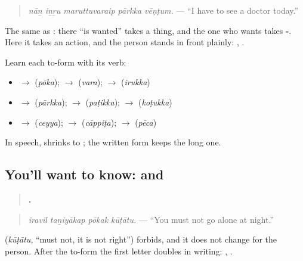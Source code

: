 \begin{quote}
\emph{nāṉ iṉṟu maruttuvaraip pārkka vēṇṭum.} — \textquotedblleft{}I have to see a doctor today.\textquotedblright{}
\end{quote}

The same \textbf{} as \textbf{  }: there \textquotedblleft{}is wanted\textquotedblright{} takes a thing, and the one who wants takes \textbf{-}. Here it takes an action, and the person stands in front plainly: \textbf{}, \textbf{}.

Learn each to-form with its verb:

\begin{itemize}
\raggedright
  \item \textbf{} $\to$ \textbf{} (\emph{pōka}); \textbf{} $\to$ \textbf{} (\emph{vara}); \textbf{} $\to$ \textbf{} (\emph{irukka})
  \item \textbf{} $\to$ \textbf{} (\emph{pārkka}); \textbf{} $\to$ \textbf{} (\emph{paṭikka}); \textbf{} $\to$ \textbf{} (\emph{koṭukka})
  \item \textbf{} $\to$ \textbf{} (\emph{ceyya}); \textbf{} $\to$ \textbf{} (\emph{cāppiṭa}); \textbf{} $\to$ \textbf{} (\emph{pēca})
\end{itemize}

In speech, \textbf{ } shrinks to \textbf{}; the written form keeps the long one.

\subsection*{You'll want to know:  and }
\begin{quote}
\textbf{   .}
\end{quote}

\begin{quote}
\emph{iravil taṉiyākap pōkak kūṭātu.} — \textquotedblleft{}You must not go alone at night.\textquotedblright{}
\end{quote}

\textbf{} (\emph{kūṭātu}, \textquotedblleft{}must not, it is not right\textquotedblright{}) forbids, and it does not change for the person. After the to-form the first letter doubles in writing: \textbf{ }, \textbf{ }.

